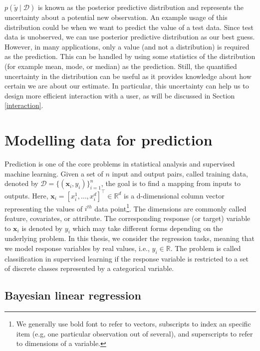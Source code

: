 \documentclass[dissertation,math,vertlayout,pdfa,colorlinks]{aaltoseries}
\newcommand{\bD}{\mathcal{D}}
\newcommand{\tp}{^{\top}}
\begin{document}
$p(\tilde{y} \mid \bD)$ is known as the posterior predictive distribution and represents the uncertainty about a potential new observation. An example usage of this distribution could be when we want to predict the value of a test data. Since test data is unobserved, we can use posterior predictive distribution as our best guess. However, in many applications, only a value (and not a distribution) is required as the prediction. This can be handled by using some statistics of the distribution (for example mean, mode, or median) as the prediction. Still, the quantified uncertainty in the distribution can be useful as it provides knowledge about how certain we are about our estimate. In particular, this uncertainty can help us to design more efficient interaction with a user, as will be discussed in Section \ref{interaction}.

	

\section{Modelling data for prediction} \label{prob_model_data}

Prediction is one of the core problems in statistical analysis and supervised machine learning. Given a set of $n$ input and output pairs, called training data, denoted by $\bD= \{(\bm{x}_i,y_i)\}_{i=1}^{n}$, the goal is to find a mapping from inputs to outputs. Here, $\bm{x}_i = [x_i^1,\ldots,x_i^d]\tp \in \mathbb{R}^d$ is a d-dimensional column vector representing the values of $i^{th}$ data point\footnote{We generally use bold font to refer to vectors, subscripts to index an specific item (e.g, one particular observation out of several), and superscripts to refer to dimensions of a variable.}. The dimensions are commonly called feature, covariates, or attribute. The corresponding response (or target) variable to $\bm{x}_i$ is denoted by $y_i$ which may take different forms depending on the underlying problem. In this thesis, we consider the regression tasks, meaning that we model response variables by real values, i.e., $y_i \in \mathbb{R}$. The problem is called classification in supervised learning if the response variable is restricted to a set of discrete classes represented by a categorical variable. 

\subsection{Bayesian linear regression}
\end{document}
